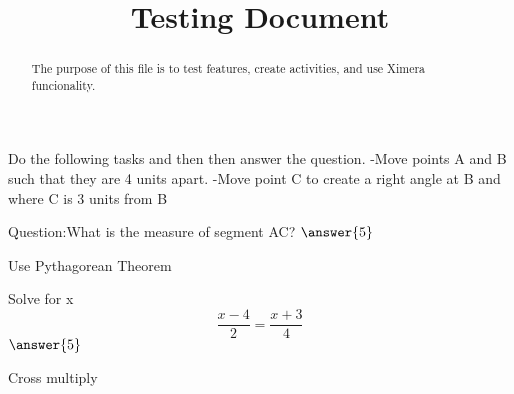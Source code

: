 \documentclass{ximera}
\title{Testing Document}
\begin{document}
\begin{abstract}
The purpose of this file is to test features, create activities, and use Ximera funcionality.
\end{abstract}
\maketitle
{}
\begin{problem}
Do the following tasks and then then answer the question.
    -Move points A and B such that they are 4 units apart.
    -Move point C to create a right angle at B and where C is 3 units from B
    
Question:What is the measure of segment AC?
$\answer{5}$
\begin{hint}
Use Pythagorean Theorem
\end{hint}
\begin{problem}
Solve for x
 \[\frac{x-4}{2}=\frac{x+3}{4}\]
$\answer{5}$
\begin{hint}
Cross multiply
\end{hint}
\end{problem}
\end{problem}
\end{document}
